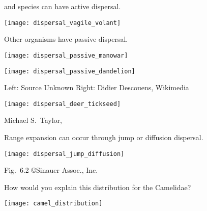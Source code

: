 \documentclass[t]{beamer}
\begin{document}
%
{
\begin{frame}[b]

\end{frame}
}
%
\begin{frame}[t]{ and  species can have active dispersal.}

	\texttt{[image: dispersal\_vagile\_volant]}
	
\end{frame}
%
\begin{frame}[t]{Other organisms have passive dispersal.}

	\begin{multicols}{2}
		\texttt{[image: dispersal\_passive\_manowar]}
		
		\columnbreak
		
		\texttt{[image: dispersal\_passive\_dandelion]}
		
	\end{multicols}
	
	\vfilll
	
	\tiny Left: Source Unknown \hfill Right: Didier Descouens, Wikimedia 
\end{frame}
%
\begin{frame}[t]

	{\centering
	\texttt{[image: dispersal\_deer\_tickseed]}\par
	}
	
	\vfilll
	
	\hfill \tiny Michael S.~Taylor, 
\end{frame}
%
\begin{frame}[t]{Range expansion can occur through jump or diffusion dispersal.}

	\vspace*{-1\baselineskip}
	{\centering
	\texttt{[image: dispersal\_jump\_diffusion]}\par
	}
	
	\vfilll
	
	\hfill \tiny Fig.~6.2 \copyright Sinauer Assoc., Inc.
\end{frame}
%
\begin{frame}[t]{How would you explain this distribution for the Camelidae?}

	\vspace*{-0.5\baselineskip}
	{\centering
	\texttt{[image: camel\_distribution]}\par
	}
	
	\vfilll
	
\end{frame}
\end{document}
